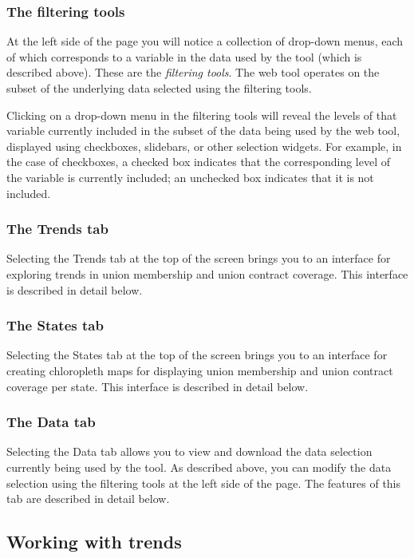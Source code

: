\documentclass[letterpaper,12pt]{article}
\begin{document}
\subsubsection{The filtering tools}

At the left side of the page you will notice a collection of drop-down
menus, each of which corresponds to a variable in the data used by the
tool (which is described above). These are the \textit{filtering
  tools}. The web tool operates on the subset of the underlying data
selected using the filtering tools.

Clicking on a drop-down menu in the filtering tools will reveal the
levels of that variable currently included in the subset of the data
being used by the web tool, displayed using checkboxes, slidebars, or
other selection widgets. For example, in the case of checkboxes, a
checked box indicates that the corresponding level of the variable is
currently included; an unchecked box indicates that it is not
included.

\subsubsection{The Trends tab}

Selecting the Trends tab at the top of the screen brings you to an
interface for exploring trends in union membership and union contract
coverage. This interface is described in detail below.

\subsubsection{The States tab}

Selecting the States tab at the top of the screen brings you to an
interface for creating chloropleth maps for displaying union
membership and union contract coverage per state. This interface is
described in detail below.

\subsubsection{The Data tab}

Selecting the Data tab allows you to view and download the data
selection currently being used by the tool. As described above, you
can modify the data selection using the filtering tools at the left
side of the page. The features of this tab are described in detail
below.

\subsection{Working with trends} \label{working_with_trends}
\end{document}
